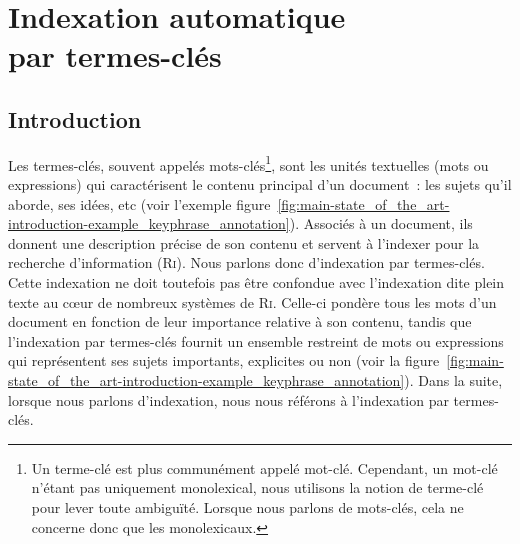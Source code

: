 \chapter[Indexation automatique par termes-clés]{Indexation automatique\\par termes-clés}
\label{chap:main-state_of_the_art}

  \section{Introduction}
  \label{sec:main-state_of_the_art-introduction}
    Les termes-clés,
    souvent appelés mots-clés\footnote{Un terme-clé est plus communément appelé
    mot-clé. Cependant, un mot-clé n'étant pas uniquement monolexical, nous
    utilisons la notion de terme-clé pour lever toute ambiguïté. Lorsque nous parlons de mots-clés, cela ne concerne donc que les
    monolexicaux.}, sont les unités textuelles (mots ou expressions) qui
    caractérisent le contenu principal d'un document~: les sujets qu'il aborde,
    ses idées, etc (voir l'exemple
    figure~\ref{fig:main-state_of_the_art-introduction-example_keyphrase_annotation}).
    Associés à un document, ils donnent une description précise de son contenu
    et servent à l'indexer pour la recherche d'information (\textsc{Ri}). Nous
    parlons donc d'indexation par termes-clés. Cette indexation ne doit toutefois pas être confondue
    avec l'indexation dite \og{}plein texte\fg{} au c\oe{}ur de nombreux
    systèmes de \textsc{Ri}. Celle-ci pondère tous les mots d'un document en
    fonction de leur importance relative à son contenu, tandis que l'indexation
    par termes-clés fournit un ensemble restreint de mots ou expressions qui
    représentent ses sujets importants, explicites ou non (voir la figure~\ref{fig:main-state_of_the_art-introduction-example_keyphrase_annotation}). Dans la suite, lorsque nous parlons d'indexation, nous
    nous référons à l'indexation par termes-clés.
